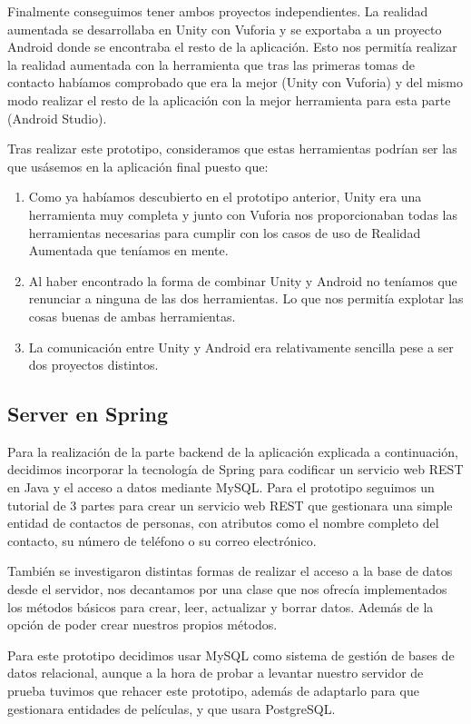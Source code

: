 Finalmente conseguimos tener ambos proyectos independientes. La realidad aumentada se desarrollaba en Unity con Vuforia y se exportaba a un proyecto Android donde se encontraba el resto de la aplicación.
Esto nos permitía realizar la realidad aumentada con la herramienta que tras las primeras tomas de contacto habíamos comprobado que era la mejor (Unity con Vuforia) y del mismo modo realizar el resto de la aplicación con la mejor herramienta para esta parte (Android Studio).

Tras realizar este prototipo, consideramos que estas herramientas podrían ser las que usásemos en la aplicación final puesto que:
\begin{enumerate}
    \item Como ya habíamos descubierto en el prototipo anterior, Unity era una herramienta muy completa y junto con Vuforia nos proporcionaban todas las herramientas necesarias para cumplir con los casos de uso de Realidad Aumentada que teníamos en mente.
    \item Al haber encontrado la forma de combinar Unity y Android no teníamos que renunciar a ninguna de las dos herramientas. Lo que nos permitía explotar las cosas buenas de ambas herramientas.
    \item La comunicación entre Unity y Android era relativamente sencilla pese a ser dos proyectos distintos.
\end{enumerate}


\subsection{Server en Spring} 
\label{makereference4.1.6}

Para la realización de la parte backend de la aplicación explicada a continuación,
decidimos incorporar la tecnología de Spring para codificar un servicio web REST en Java
y el acceso a datos mediante MySQL. Para el prototipo seguimos un tutorial\cite{tutorialspring} de 3 partes para crear un servicio web REST
que gestionara una simple entidad de contactos de personas, con atributos como el nombre completo del contacto, su número de teléfono o su correo electrónico.

También se investigaron distintas formas de realizar el acceso a la base de datos desde el servidor, nos decantamos por una clase que nos ofrecía implementados los métodos básicos para crear, leer, actualizar y borrar datos. Además de la opción 
de poder crear nuestros propios métodos.

Para este prototipo decidimos usar MySQL como sistema de gestión de bases de datos relacional, aunque
a la hora de probar a levantar nuestro servidor de prueba tuvimos que rehacer este prototipo, además de adaptarlo para 
que gestionara entidades de películas, y que usara PostgreSQL.
